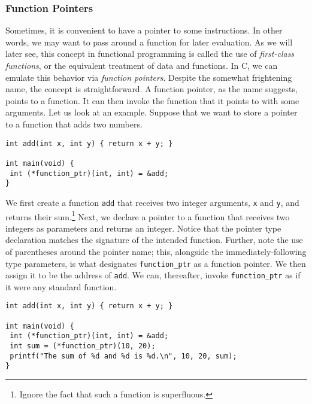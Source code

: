 \subsubsection*{Function Pointers}
Sometimes, it is convenient to have a pointer to some instructions. In other words, we may want to pass around a function for later evaluation. As we will later see, this concept in functional programming is called the use of \textit{first-class functions}, or the equivalent treatment of data and functions. In C, we can emulate this behavior via \textit{function pointers}. Despite the somewhat frightening name, the concept is straightforward. A function pointer, as the name suggests, points to a function. It can then invoke the function that it points to with some arguments. Let us look at an example. Suppose that we want to store a pointer to a function that adds two numbers.

\begin{cl}[]{}\begin{lstlisting}[language=MyC]
int add(int x, int y) { return x + y; }

int main(void) {
 int (*function_ptr)(int, int) = &add;
}
\end{lstlisting}\end{cl}

We first create a function \texttt{add} that receives two integer arguments, \texttt{x} and \texttt{y}, and returns their sum.\footnote{Ignore the fact that such a function is superfluous.} Next, we declare a pointer to a function that receives two integers as parameters and returns an integer. Notice that the pointer type declaration matches the signature of the intended function. Further, note the use of parentheses around the pointer name; this, alongside the immediately-following type parameters, is what designates \texttt{function\_ptr} as a function pointer. We then assign it to be the address of \texttt{add}. We can, thereafter, invoke \texttt{function\_ptr} as if it were any standard function.

\begin{cl}[]{}\begin{lstlisting}[language=MyC]
int add(int x, int y) { return x + y; }

int main(void) {
 int (*function_ptr)(int, int) = &add;
 int sum = (*function_ptr)(10, 20);
 printf("The sum of %d and %d is %d.\n", 10, 20, sum);
}
\end{lstlisting}\end{cl}


